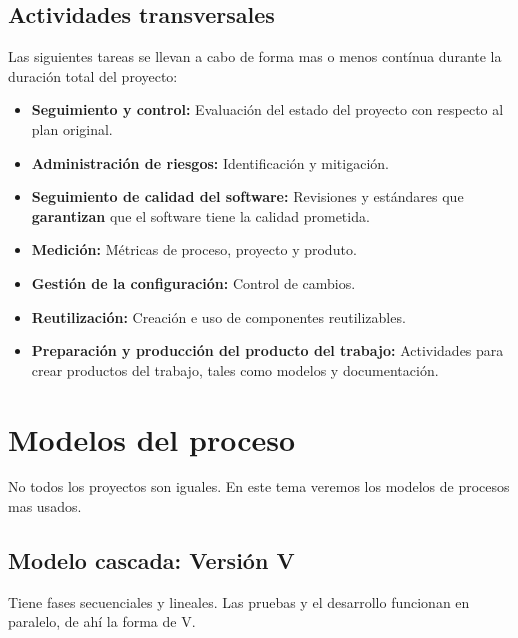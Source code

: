 \documentclass[a4paper,11pt]{report}
\begin{document}
    \subsection{Actividades transversales}\label{subsec:actividades-transversales}
    Las siguientes tareas se llevan a cabo de forma mas o menos contínua durante la duración total del proyecto:
    \begin{itemize}
        \item \textbf{Seguimiento y control:} Evaluación del estado del proyecto con respecto al plan original.

        \item \textbf{Administración de riesgos:} Identificación y mitigación.

        \item \textbf{Seguimiento de calidad del software:} Revisiones y estándares que \textbf{garantizan} que el software tiene la calidad prometida.


        \item \textbf{Medición:} Métricas de proceso, proyecto y produto.

        \item \textbf{Gestión de la configuración:} Control de cambios.

        \item \textbf{Reutilización:} Creación e uso de componentes reutilizables.
        \item \textbf{Preparación y producción del producto del trabajo:} Actividades  para crear productos del trabajo, tales como modelos y documentación.

    \end{itemize}

    \section{Modelos del proceso}\label{sec:modelos-del-proceso}

    No todos los proyectos son iguales.
    En este tema veremos los modelos de procesos mas usados.

    \clearpage
    \subsection{Modelo cascada: Versión V}\label{subsec:modelo-cascada:-version-v}

    Tiene fases secuenciales y lineales.
    Las pruebas y el desarrollo funcionan en paralelo, de ahí la forma de V\@.
\end{document}
